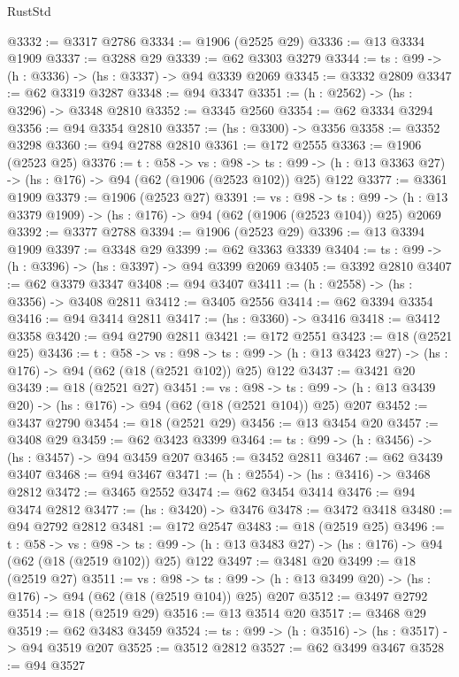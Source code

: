 \begin{lexlean}{RustStd}
\begin{coremodule}
@3332 := @3317 @2786
@3334 := @1906 (@2525 @29)
@3336 := @13 @3334 @1909
@3337 := @3288 @29
@3339 := @62 @3303 @3279
@3344 := {ts : @99} -> (h : @3336) -> (hs : @3337) -> @94 @3339 @2069
@3345 := @3332 @2809
@3347 := @62 @3319 @3287
@3348 := @94 @3347
@3351 := (h : @2562) -> (hs : @3296) -> @3348 @2810
@3352 := @3345 @2560
@3354 := @62 @3334 @3294
@3356 := @94 @3354 @2810
@3357 := (hs : @3300) -> @3356
@3358 := @3352 @3298
@3360 := @94 @2788 @2810
@3361 := @172 @2555
@3363 := @1906 (@2523 @25)
@3376 := {t : @58} ->
  {vs : @98} ->
  {ts : @99} -> (h : @13 @3363 @27) -> (hs : @176) -> @94 (@62 (@1906 (@2523 @102)) @25) @122
@3377 := @3361 @1909
@3379 := @1906 (@2523 @27)
@3391 := {vs : @98} ->
  {ts : @99} -> (h : @13 @3379 @1909) -> (hs : @176) -> @94 (@62 (@1906 (@2523 @104)) @25) @2069
@3392 := @3377 @2788
@3394 := @1906 (@2523 @29)
@3396 := @13 @3394 @1909
@3397 := @3348 @29
@3399 := @62 @3363 @3339
@3404 := {ts : @99} -> (h : @3396) -> (hs : @3397) -> @94 @3399 @2069
@3405 := @3392 @2810
@3407 := @62 @3379 @3347
@3408 := @94 @3407
@3411 := (h : @2558) -> (hs : @3356) -> @3408 @2811
@3412 := @3405 @2556
@3414 := @62 @3394 @3354
@3416 := @94 @3414 @2811
@3417 := (hs : @3360) -> @3416
@3418 := @3412 @3358
@3420 := @94 @2790 @2811
@3421 := @172 @2551
@3423 := @18 (@2521 @25)
@3436 := {t : @58} ->
  {vs : @98} ->
  {ts : @99} -> (h : @13 @3423 @27) -> (hs : @176) -> @94 (@62 (@18 (@2521 @102)) @25) @122
@3437 := @3421 @20
@3439 := @18 (@2521 @27)
@3451 := {vs : @98} ->
  {ts : @99} -> (h : @13 @3439 @20) -> (hs : @176) -> @94 (@62 (@18 (@2521 @104)) @25) @207
@3452 := @3437 @2790
@3454 := @18 (@2521 @29)
@3456 := @13 @3454 @20
@3457 := @3408 @29
@3459 := @62 @3423 @3399
@3464 := {ts : @99} -> (h : @3456) -> (hs : @3457) -> @94 @3459 @207
@3465 := @3452 @2811
@3467 := @62 @3439 @3407
@3468 := @94 @3467
@3471 := (h : @2554) -> (hs : @3416) -> @3468 @2812
@3472 := @3465 @2552
@3474 := @62 @3454 @3414
@3476 := @94 @3474 @2812
@3477 := (hs : @3420) -> @3476
@3478 := @3472 @3418
@3480 := @94 @2792 @2812
@3481 := @172 @2547
@3483 := @18 (@2519 @25)
@3496 := {t : @58} ->
  {vs : @98} ->
  {ts : @99} -> (h : @13 @3483 @27) -> (hs : @176) -> @94 (@62 (@18 (@2519 @102)) @25) @122
@3497 := @3481 @20
@3499 := @18 (@2519 @27)
@3511 := {vs : @98} ->
  {ts : @99} -> (h : @13 @3499 @20) -> (hs : @176) -> @94 (@62 (@18 (@2519 @104)) @25) @207
@3512 := @3497 @2792
@3514 := @18 (@2519 @29)
@3516 := @13 @3514 @20
@3517 := @3468 @29
@3519 := @62 @3483 @3459
@3524 := {ts : @99} -> (h : @3516) -> (hs : @3517) -> @94 @3519 @207
@3525 := @3512 @2812
@3527 := @62 @3499 @3467
@3528 := @94 @3527

\end{coremodule}
\end{lexlean}
